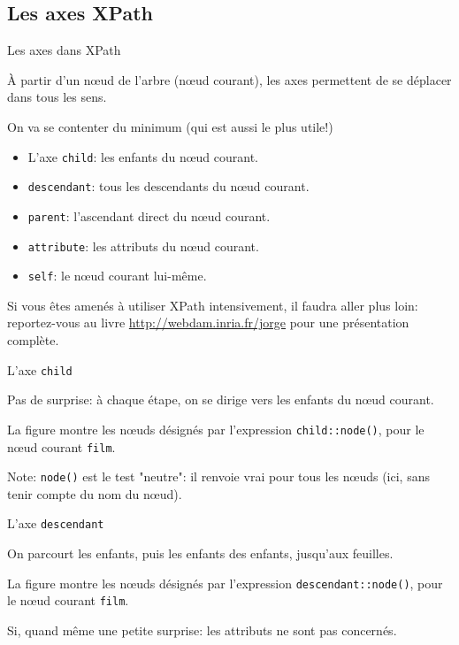 \subsection{Les axes XPath}

\begin{frame}{Les axes dans XPath}

À partir d'un nœud de l'arbre (nœud courant), les axes permettent 
de se déplacer dans tous les sens.   

\vfill

On va se contenter du minimum (qui est aussi le plus utile!)

\begin{itemize}
  \item L'axe \texttt{child}: les enfants du nœud courant.
  \item \texttt{descendant}: tous les descendants du nœud courant.
  \item \texttt{parent}: l'ascendant direct du nœud courant. 
  \item \texttt{attribute}: les attributs du nœud courant.
  \item \texttt{self}: le nœud courant lui-même.
\end{itemize}

\begin{remark}
Si vous êtes amenés à utiliser XPath intensivement, il faudra aller plus loin:
reportez-vous au livre \url{http://webdam.inria.fr/jorge} pour une présentation complète.
\end{remark}
\end{frame}


\begin{frame}{L'axe \texttt{child}}

Pas de surprise: à chaque \alert{étape}, on se dirige vers les enfants du nœud courant.

\vfill

La figure montre les nœuds désignés par l'expression \texttt{child::node()}, pour le
nœud courant \texttt{film}.


\vfill

\begin{remark}
Note: \texttt{node()} est le test "neutre": il renvoie vrai pour tous les nœuds (ici, sans
tenir compte du \alert{nom} du nœud).
\end{remark}
\end{frame}


\begin{frame}{L'axe \texttt{descendant}}

On parcourt les enfants, puis les enfants des enfants, jusqu'aux feuilles.

\vfill

La figure montre les nœuds désignés par l'expression \texttt{descendant::node()}, pour le
nœud courant \texttt{film}.


\begin{remark}
Si, quand même une petite surprise: les \alert{attributs} ne sont pas concernés. 
\end{remark}
\end{frame}


